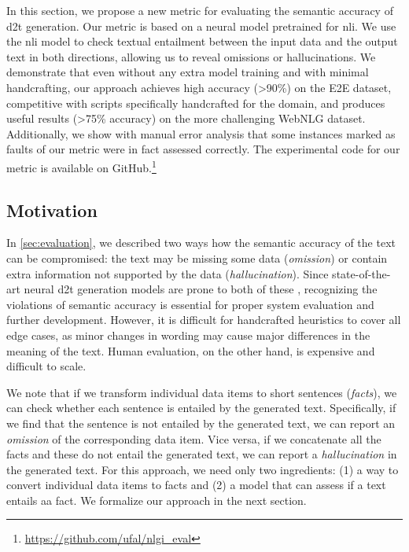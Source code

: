 In this section, we propose a new metric for evaluating the semantic accuracy of \ac{d2t} generation. Our metric is based on a neural model pretrained for \ac{nli}.
We use the \ac{nli} model to check textual entailment between the input data and the output text in both directions, allowing us to reveal omissions or hallucinations.
We demonstrate that even without any extra model training and with minimal handcrafting, our approach achieves high accuracy (>90\%) on the E2E dataset, competitive with scripts specifically handcrafted for the domain, and produces useful results (>75\% accuracy) on the more challenging WebNLG dataset. Additionally, we show with manual error analysis that some instances marked as faults of our metric were in fact assessed correctly. The experimental code for our metric is available on GitHub.\footnote{\url{https://github.com/ufal/nlgi_eval}}

\subsection{Motivation}
In \autoref{sec:evaluation}, we described two ways how the semantic accuracy of the text can be compromised: the text may be missing some data (\emph{omission}) or contain extra information not supported by the data (\emph{hallucination}). Since state-of-the-art neural \ac{d2t} generation models are prone to both of these \cite{gehrmannEndtoEndContentPlan2018,ferreiraNeuralDatatotextGeneration2019,dusekEvaluatingStateoftheartEndtoEnd2020}, recognizing the violations of semantic accuracy is essential for proper system evaluation and further development. However, it is difficult for handcrafted heuristics to cover all edge cases, as minor changes in wording may cause major differences in the meaning of the text. Human evaluation, on the other hand, is expensive and difficult to scale.

We note that if we transform individual data items to short sentences (\emph{facts}), we can check whether each sentence is entailed by the generated text. Specifically, if we find that the sentence is not entailed by the generated text, we can report an \emph{omission} of the corresponding data item. Vice versa, if we concatenate all the facts and these do not entail the generated text, we can report a \emph{hallucination} in the generated text. For this approach, we need only two ingredients: (1) a way to convert individual data items to facts and (2) a model that can assess if a text entails aa fact. We formalize our approach in the next section.




